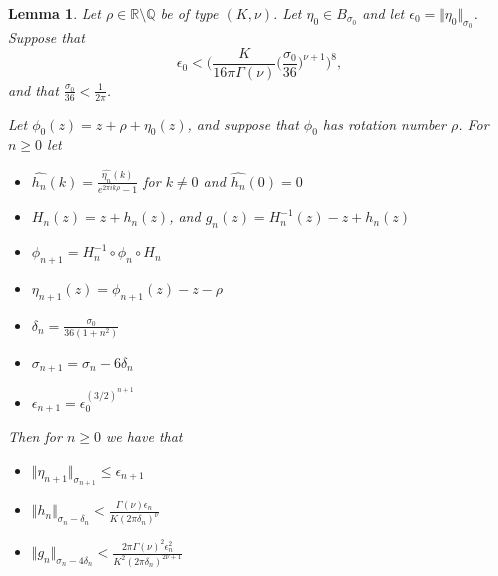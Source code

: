 \documentclass{article}
\newcommand{\norm}[1]{\Vert #1 \Vert}
\newtheorem{lemma}[theorem]{Lemma}
\begin{document}
\begin{lemma}
\label{induction}
Let $\rho \in \mathbb{R} \setminus \mathbb{Q}$ be of type $(K,\nu)$.
Let $\eta_0 \in B_{\sigma_0}$ and let $\epsilon_0=\norm{\eta_0}_{\sigma_0}$.
Suppose that 
\begin{equation}
\label{epsilon0}
\epsilon_0 < \Big( \frac{K}{16\pi \Gamma(\nu)} \Big( \frac{\sigma_0}{36} \Big)^{\nu+1} \Big)^8,
\end{equation}
and that $\frac{\sigma_0}{36}<\frac{1}{2\pi}$.

Let $\phi_0(z)=z+\rho+\eta_0(z)$, and suppose that $\phi_0$ has rotation number $\rho$. For $n \geq 0$ let
\begin{itemize}
\item $\widehat{h_n}(k)=\frac{\widehat{\eta_n}(k)}{e^{2\pi i k\rho}-1}$ for $k \neq 0$ and $\widehat{h_n}(0)=0$
\item $H_n(z)=z+h_n(z)$, and $g_n(z)=H_n^{-1}(z)-z+h_n(z)$
\item $\phi_{n+1}=H_n^{-1} \circ \phi_n \circ H_n$
\item $\eta_{n+1}(z)=\phi_{n+1}(z)-z-\rho$
\item $\delta_n=\frac{\sigma_0}{36(1+n^2)}$
\item $\sigma_{n+1}=\sigma_n-6\delta_n$
\item $\epsilon_{n+1}=\epsilon_0^{(3/2)^{n+1}}$
\end{itemize}

Then for $n \geq 0$ we have that
\begin{itemize}
\item $\norm{\eta_{n+1}}_{\sigma_{n+1}} \leq \epsilon_{n+1}$
\item $\norm{h_n}_{\sigma_n-\delta_n} < \frac{\Gamma(\nu)\epsilon_n}{K(2\pi \delta_n)^\nu}$
\item $\norm{g_n}_{\sigma_n-4\delta_n} < \frac{2\pi\Gamma(\nu)^2\epsilon_n^2}{K^2(2\pi \delta_n)^{2\nu+1}}$
\end{itemize}
\end{lemma}
\end{document}
